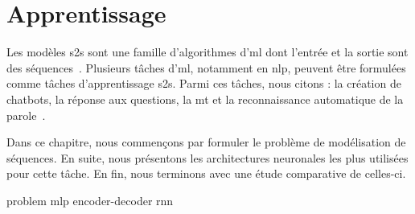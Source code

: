 \chapter{Apprentissage }

Les modèles \gls{s2s} sont une famille d'algorithmes d'\gls{ml}
dont l'entrée et la sortie sont des séquences~\cite{Martins_2018}.
Plusieurs tâches d'\gls{ml}, notamment en \gls{nlp}, 
peuvent être formulées comme tâches d'apprentissage \gls{s2s}.
Parmi ces tâches, nous citons : la création de chatbots, la réponse aux questions, 
la \gls{mt} et la reconnaissance automatique de la parole~\cite{Fathi_2021}.

Dans ce chapitre, nous commençons par formuler le problème de modélisation de séquences.
En suite, nous présentons les architectures neuronales les plus utilisées pour cette tâche.
En fin, nous terminons avec une étude comparative de celles-ci.

{problem}
{mlp}
{encoder-decoder}
{rnn}


